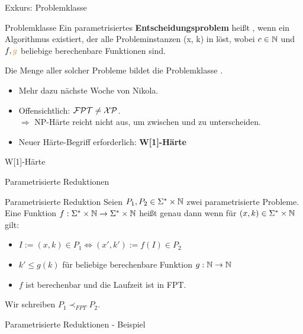 \documentclass[navbaroff]{sdqbeamer}
\begin{document}
\begin{frame}[t]{Exkurs: Problemklasse \XP}
    \begin{blueblock}{Problemklasse \XP}
        Ein parametrisiertes \textbf{Entscheidungsproblem} heißt ,
        wenn ein Algorithmus existiert, der alle Probleminstanzen (x, k) in  löst, wobei $ c \in \mathbb{N} $ und $f, \textcolor{orange}{g}$ beliebige berechenbare Funktionen sind.

        \vspace{10pt}
        Die Menge aller solcher Probleme bildet die Problemklasse \blue{\XP}.
    \end{blueblock}
    \begin{itemize}
        \item Mehr dazu nächste Woche von Nikola.
        \item Offensichtlich: $\mathcal{FPT} \neq \mathcal{XP}$.
        \\$\Rightarrow$ NP-Härte reicht nicht aus, um zwischen \FPT und \XP zu unterscheiden.
        \item Neuer Härte-Begriff erforderlich: \textbf{W[1]-Härte}
    \end{itemize}
\end{frame}

\begin{frame}{W[1]-Härte}
    
\end{frame}

\begin{frame}[t]{Parametrisierte Reduktionen}
    \begin{blueblock}{Parametrisierte Reduktion}
        Seien $P_1, P_2 \in \Sigma^* \times \mathbb{N}$ zwei parametrisierte Probleme.
        \\
        Eine Funktion $f: \Sigma^* \times \mathbb{N} \rightarrow \Sigma^* \times \mathbb{N}$ heißt genau dann  wenn
        für $(x, k) \in \Sigma^* \times \mathbb{N}$ gilt:
        \begin{itemize}
            \item $I:=(x, k) \in P_1 \iff (x', k') := f(I) \in P_2$
            \item $k' \leq g(k)$ für beliebige berechenbare Funktion $g: \mathbb{N} \rightarrow \mathbb{N}$
            \item $f$ ist berechenbar und die Laufzeit ist in FPT.
        \end{itemize}
        \vspace{10pt}
        Wir schreiben $P_1 \prec_{FPT} P_2$.
    \end{blueblock}
\end{frame}

\begin{frame}{Parametrisierte Reduktionen - Beispiel}
    
\end{frame}
\end{document}
